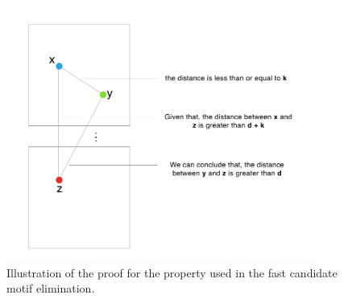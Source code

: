 \begin{figure}[h]
	\centering
	\includegraphics[width=4.0in]{contents/00_images/theorem-proof}\vspace*{5pt}
	
	\caption{Illustration of the proof for the property used in the fast candidate motif elimination.}
	\label{fig:theorem-proof}
\end{figure}